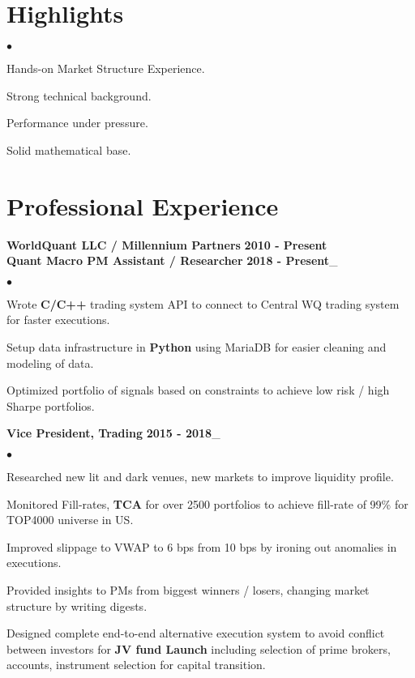 \documentclass[margin,line]{res}
\newenvironment{list2}{
  \begin{list}{$\bullet$}{%
      \setlength{\itemsep}{0.05in}
      \setlength{\parsep}{0in} \setlength{\parskip}{0in}
      \setlength{\topsep}{-0.1in} \setlength{\partopsep}{0in}
      \setlength{\leftmargin}{0.2in}}}{\end{list}}
\begin{document}
\address{  	New York, NY $\bullet$ 917-558-4825 $\bullet$ 
		\href{mailto: harsshal@nyu.edu} {harsshal@nyu.edu} $\bullet$
          	\href{https://sites.google.com/site/harsshal/}{https://sites.google.com/site/harsshal/} }

\vspace {0.1in}
\begin{resume}
\section{\sc Highlights}
\begin{list2}
\begin{minipage}{0.5\linewidth}
\item Hands-on Market Structure Experience.
\item Strong technical background.
\end{minipage}
\begin{minipage}{0.4\linewidth}
\item Performance under pressure.
\item Solid mathematical base.
\end{minipage}
\end{list2}

\section{\sc Professional Experience}
{\bf WorldQuant LLC / Millennium Partners} \hfill {\bf 2010 - Present}\\
{\bf Quant Macro PM Assistant / Researcher} \hfill {\bf 2018 - Present}\_
\begin{list2}
\item Wrote {\bf C/C++} trading system API to connect to Central WQ trading system for faster executions.
\item Setup data infrastructure in {\bf Python} using MariaDB for easier cleaning and modeling of data.
\item Optimized portfolio of signals based on constraints to achieve low risk / high Sharpe portfolios.
\end{list2}

{\bf Vice President, Trading} \hfill {\bf 2015 - 2018}\_
\begin{list2}
\item Researched new lit and dark venues, new markets to improve liquidity profile.
\item Monitored Fill-rates, {\bf TCA} for over 2500 portfolios to achieve fill-rate of 99\% for TOP4000 universe in US.
\item Improved slippage to VWAP to 6 bps from 10 bps by ironing out anomalies in executions.
\item Provided insights to PMs from biggest winners / losers, changing market structure by writing digests.
\item Designed complete end-to-end alternative execution system to avoid conflict between investors for {\bf JV fund Launch} including selection of prime brokers, accounts, instrument selection for capital transition.
\end{list2}


\end{resume}
\end{document}
